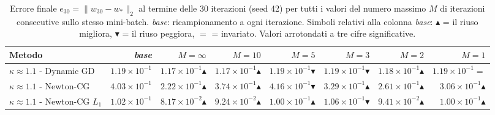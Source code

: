 




\begin{table}[H]

\centering

\tiny

\renewcommand{\arraystretch}{1.0}

\setlength{\tabcolsep}{1.5pt}

\caption{Errore finale $e_{30}=\|w_{30}-w_*\|_2$ al termine delle 30 iterazioni (seed 42) per tutti i valori del numero massimo $M$ di iterazioni consecutive sullo stesso mini-batch. \emph{base}: ricampionamento a ogni iterazione. Simboli relativi alla colonna \emph{base}: $\blacktriangle$ = il riuso migliora, $\blacktriangledown$ = il riuso peggiora, $=$ = invariato. Valori arrotondati a tre cifre significative.}

\label{tab:riuso_sintesi}

\begin{tabular}{@{}lrrrrrrr@{}}

\toprule

Metodo & \emph{base} & $M{=}\infty$ & $M{=}10$ & $M{=}5$ & $M{=}3$ & $M{=}2$ & $M{=}1$\\

\midrule

$\kappa\approx1.1$ - Dynamic GD & $1.19\times10^{-1}$ & $1.17\times10^{-1}$$\blacktriangle$ & $1.17\times10^{-1}$$\blacktriangle$ & $1.19\times10^{-1}$$\blacktriangledown$ & $1.19\times10^{-1}$$\blacktriangledown$ & $1.18\times10^{-1}$$\blacktriangle$ & $1.19\times10^{-1}$$=$\\

$\kappa\approx1.1$ - Newton-CG & $4.03\times10^{-1}$ & $2.22\times10^{-1}$$\blacktriangle$ & $3.74\times10^{-1}$$\blacktriangle$ & $4.16\times10^{-1}$$\blacktriangledown$ & $3.29\times10^{-1}$$\blacktriangle$ & $2.61\times10^{-1}$$\blacktriangle$ & $3.06\times10^{-1}$$\blacktriangle$\\

$\kappa\approx1.1$ - Newton-CG $L_1$ & $1.02\times10^{-1}$ & $8.17\times10^{-2}$$\blacktriangle$ & $9.24\times10^{-2}$$\blacktriangle$ & $1.00\times10^{-1}$$\blacktriangle$ & $1.06\times10^{-1}$$\blacktriangledown$ & $9.41\times10^{-2}$$\blacktriangle$ & $1.00\times10^{-1}$$\blacktriangle$\\


\end{tabular}
\end{table}
